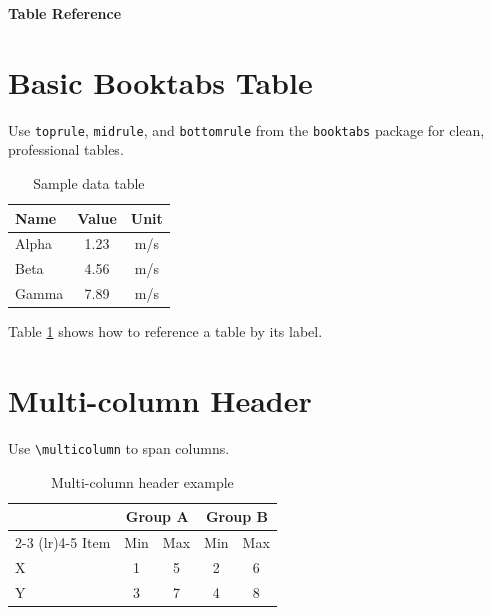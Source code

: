 \documentclass[11pt]{article}
\begin{document}
\centerline{\Large\bf Table Reference}\par
\bigskip

\section{Basic Booktabs Table}

Use \texttt{toprule}, \texttt{midrule}, and \texttt{bottomrule} from the \texttt{booktabs} package for clean, professional tables.

\begin{table}[h!]
    \centering
    \caption{Sample data table}
    \label{tab:sample}
    \begin{tabular}{lcc}
        \toprule
        Name   & Value & Unit  \\
        \midrule
        Alpha  & 1.23  & m/s   \\
        Beta   & 4.56  & m/s   \\
        Gamma  & 7.89  & m/s   \\
        \bottomrule
    \end{tabular}
\end{table}

Table \ref{tab:sample} shows how to reference a table by its label.

\section{Multi-column Header}

Use \texttt{\textbackslash multicolumn} to span columns.

\begin{table}[h!]
    \centering
    \caption{Multi-column header example}
    \begin{tabular}{lcccc}
        \toprule
        & \multicolumn{2}{c}{Group A} & \multicolumn{2}{c}{Group B} \\
        \cmidrule(lr){2-3} \cmidrule(lr){4-5}
        Item & Min & Max & Min & Max \\
        \midrule
        X & 1 & 5 & 2 & 6 \\
        Y & 3 & 7 & 4 & 8 \\
        \bottomrule
    \end{tabular}
\end{table}
\end{document}
